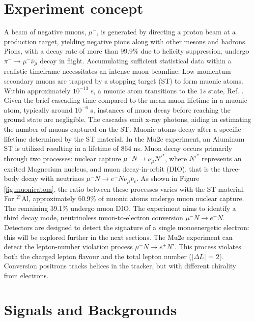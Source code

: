 \section{Experiment concept}
A beam of negative muons, $\mu ^-$, is generated by directing a proton beam at a production target, yielding negative pions along with other mesons and hadrons. 
Pions, with a decay rate of more than 99.9\% due to helicity suppression, undergo $\pi ^- \rightarrow \mu ^- \bar{\nu}_\mu$ decay in flight. 
Accumulating sufficient statistical data within a realistic timeframe necessitates an intense muon beamline. 
Low-momentum secondary muons are trapped by a stopping target (ST) to form muonic atoms. Within approximately $10^{-13}$ s, 
a muonic atom transitions to the $1s$ state, Ref. \cite{MEASDAY2001243}. 
Given the brief cascading time compared to the mean muon lifetime in a muonic atom, typically around $10^{-6}$ s, 
instances of muon decay before reaching the ground state are negligible. 
The cascades emit x-ray photons, aiding in estimating the number of muons captured on the ST. 
Muonic atoms decay after a specific lifetime determined by the ST material. 
In the Mu2e experiment, an Aluminum ST is utilized resulting in a lifetime of 
864 ns. Muon decay occurs primarily through two processes: 
nuclear capture $\mu^- N \rightarrow \nu_\mu N'^* $, where $N'^*$ represents an excited 
Magnesium nucleus, and muon decay-in-orbit (DIO), 
that is the three-body decay with neutrinos $\mu ^- N \rightarrow e^- N \nu_\mu \bar{\nu}_e$. 
As shown in Figure \ref{fig:muonicatom}, the ratio between these 
processes varies with the ST material. For $^{27}$Al, approximately 60.9\% 
of muonic atoms undergo muon nuclear capture. The remaining 39.1\% undergo muon DIO. 
The experiment aims to identify a third decay mode, neutrinoless muon-to-electron 
conversion $\mu^- N \rightarrow e^- N $. Detectors are designed to detect the signature of a 
single monoenergetic electron: this will be explored further in the next sections.
The Mu2e experiment can detect the lepton-number violation process $\mu^- N \rightarrow e^+ N'$.
This process violates both the charged lepton flavour and the total lepton number ($|\Delta L|$ = 2). 
Conversion positrons tracks helices in the tracker, but with different chirality from electrons. 
\section{Signals and Backgrounds}\label{sigandbkg}
